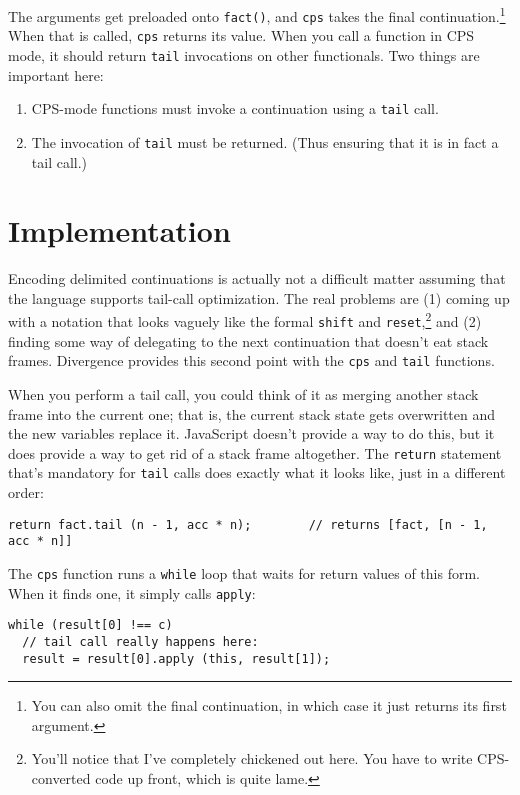 \documentclass{report}
\begin{document}
    The arguments get preloaded onto \verb|fact()|, and \verb|cps| takes the final continuation.\footnote{You can also omit the final continuation, in which case it just returns its first
    argument.} When that is called, \verb|cps| returns its value. When you call a function in CPS mode, it should return \verb|tail| invocations on other functionals. Two things are important
    here:

\begin{enumerate}
\item CPS-mode functions must invoke a continuation using a \verb|tail| call.
\item The invocation of \verb|tail| must be returned. (Thus ensuring that it is in fact a tail call.)
\end{enumerate}

\section {Implementation}
      Encoding delimited continuations is actually not a difficult matter assuming that the language supports tail-call optimization. The real problems are (1) coming up with a notation that
      looks vaguely like the formal \verb|shift| and \verb|reset|,\footnote{You'll notice that I've completely chickened out here. You have to write CPS-converted code up front, which is quite
      lame.} and (2) finding some way of delegating to the next continuation that doesn't eat stack frames. Divergence provides this second point with the \verb|cps| and \verb|tail| functions.

      When you perform a tail call, you could think of it as merging another stack frame into the current one; that is, the current stack state gets overwritten and the new variables replace
      it. JavaScript doesn't provide a way to do this, but it does provide a way to get rid of a stack frame altogether. The \verb|return| statement that's mandatory for \verb|tail| calls does
      exactly what it looks like, just in a different order:

\begin{verbatim}
return fact.tail (n - 1, acc * n);        // returns [fact, [n - 1, acc * n]]
\end{verbatim}

      The \verb|cps| function runs a \verb|while| loop that waits for return values of this form. When it finds one, it simply calls \verb|apply|:

\begin{verbatim}
while (result[0] !== c)
  // tail call really happens here:
  result = result[0].apply (this, result[1]);
\end{verbatim}
\end{document}
